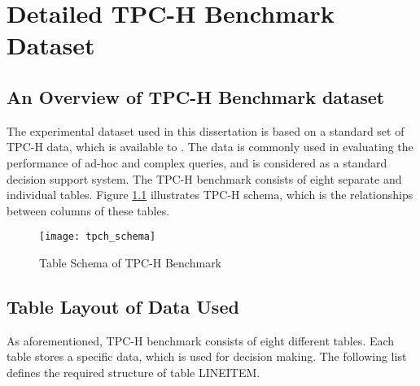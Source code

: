 \documentclass[../main/thesis.tex]{subfiles}
\begin{document}
\chapter{Detailed TPC-H Benchmark Dataset}

\section{An Overview of TPC-H Benchmark dataset}
The experimental dataset used in this dissertation is based on a standard set of TPC-H data, which is available to \cite{tpch}. The data is commonly used in evaluating the performance of ad-hoc and complex queries, and is considered as a standard decision support system. The TPC-H benchmark consists of eight separate and individual tables. Figure \ref{fig:tpch_scheme} illustrates TPC-H schema, which is the relationships between columns of these tables.

\begin{figure}[h]
	\centering
	\texttt{[image: tpch\_schema]}
	\caption{Table Schema of TPC-H Benchmark}
	\label{fig:tpch_scheme}
\end{figure}

\section{Table Layout of Data Used}
As aforementioned, TPC-H benchmark consists of eight different tables. Each table stores a specific data, which is used for decision making. The following list defines the required structure of table LINEITEM.
\end{document}
